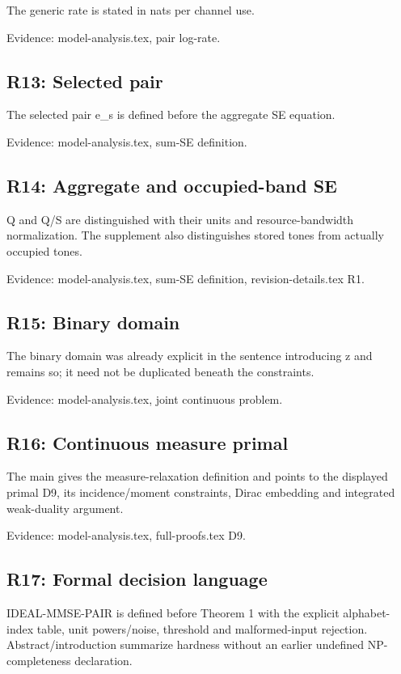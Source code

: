 \documentclass[10pt]{article}
\begin{document}
The generic rate is stated in nats per channel use.

{\small Evidence: model-analysis.tex, pair log-rate.}

\subsection*{R13: Selected pair}

The selected pair e\_\allowbreak s is defined before the aggregate SE equation.

{\small Evidence: model-analysis.tex, sum-SE definition.}

\subsection*{R14: Aggregate and occupied-band SE}

Q and Q/\allowbreak S are distinguished with their units and resource-bandwidth normalization. The supplement also distinguishes stored tones from actually occupied tones.

{\small Evidence: model-analysis.tex, sum-SE definition, revision-details.tex R1.}

\subsection*{R15: Binary domain}

The binary domain was already explicit in the sentence introducing z and remains so; it need not be duplicated beneath the constraints.

{\small Evidence: model-analysis.tex, joint continuous problem.}

\subsection*{R16: Continuous measure primal}

The main gives the measure-relaxation definition and points to the displayed primal D9, its incidence/\allowbreak moment constraints, Dirac embedding and integrated weak-duality argument.

{\small Evidence: model-analysis.tex, full-proofs.tex D9.}

\subsection*{R17: Formal decision language}

IDEAL-MMSE-PAIR is defined before Theorem 1 with the explicit alphabet-index table, unit powers/\allowbreak noise, threshold and malformed-input rejection. Abstract/\allowbreak introduction summarize hardness without an earlier undefined NP-completeness declaration.
\end{document}
